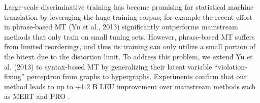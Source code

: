 Large-scale discriminative training has become promising for statistical machine translation by leveraging the huge training corpus; for example the recent effort in phrase-based MT (Yu et al., 2013) significantly outperforms mainstream methods that only train on small tuning sets. However, phrase-based MT suffers from limited reorderings, and thus its training can only utilize a small portion of the bitext due to the distortion limit. To address this problem, we extend Yu et al. (2013) to syntax-based MT by generalizing their latent variable ``violation-fixing'' perceptron from graphs to hypergraphs. Experiments confirm that our method leads to up to +1.2 B LEU improvement over mainstream methods such as MERT and PRO .
